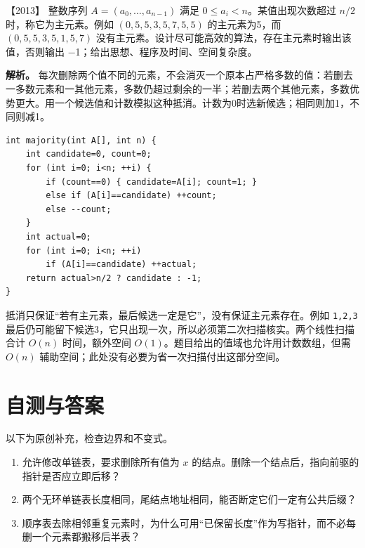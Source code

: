 \noindent{}【2013】 整数序列 \(A=(a_0,\ldots,a_{n-1})\) 满足 \(0\le a_i<n\)。某值出现次数超过 \(n/2\) 时，称它为主元素。例如 \((0,5,5,3,5,7,5,5)\) 的主元素为5，而 \((0,5,5,3,5,1,5,7)\) 没有主元素。设计尽可能高效的算法，存在主元素时输出该值，否则输出 −1；给出思想、程序及时间、空间复杂度。


\textbf{解析。} 每次删除两个值不同的元素，不会消灭一个原本占严格多数的值：若删去一多数元素和一其他元素，多数仍超过剩余的一半；若删去两个其他元素，多数优势更大。用一个候选值和计数模拟这种抵消。计数为0时选新候选；相同则加1，不同则减1。

\par\medskip\noindent
\begin{minipage}{\linewidth}
\begin{verbatim}
int majority(int A[], int n) {
    int candidate=0, count=0;
    for (int i=0; i<n; ++i) {
        if (count==0) { candidate=A[i]; count=1; }
        else if (A[i]==candidate) ++count;
        else --count;
    }
    int actual=0;
    for (int i=0; i<n; ++i)
        if (A[i]==candidate) ++actual;
    return actual>n/2 ? candidate : -1;
}
\end{verbatim}
\end{minipage}\par\medskip

抵消只保证``若有主元素，最后候选一定是它''，没有保证主元素存在。例如 \allowbreak{}\texttt{1,}\allowbreak{}\texttt{2,}\allowbreak{}\texttt{3} 最后仍可能留下候选3，它只出现一次，所以必须第二次扫描核实。两个线性扫描合计 \(O(n)\) 时间，额外空间 \(O(1)\)。题目给出的值域也允许用计数数组，但需 \(O(n)\) 辅助空间；此处没有必要为省一次扫描付出这部分空间。

\section{自测与答案}\label{ds-ch2-check}

以下为原创补充，检查边界和不变式。

\begin{enumerate}
\def\labelenumi{\arabic{enumi}.}
\tightlist
\item
  允许修改单链表，要求删除所有值为 \(x\) 的结点。删除一个结点后，指向前驱的指针是否应立即后移？
\item
  两个无环单链表长度相同，尾结点地址相同，能否断定它们一定有公共后缀？
\item
  顺序表去除相邻重复元素时，为什么可用``已保留长度''作为写指针，而不必每删一个元素都搬移后半表？
\end{enumerate}

